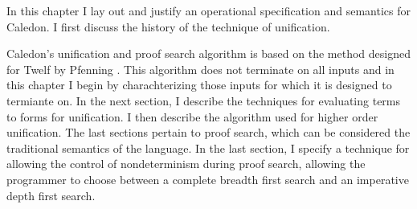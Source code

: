 In this chapter I lay out and justify an operational specification and semantics 
for Caledon.  I first discuss the history of the technique of unification.

Caledon's unification and proof search algorithm is based on the method designed for Twelf by Pfenning
\citep{pfenning1991logic}.  This algorithm does not terminate on all inputs and in this chapter 
I begin by charachterizing those inputs for which it is designed to termiante on.  In the next section, I describe
the techniques for evaluating terms to forms for unification.  I then describe the algorithm
used for higher order unification.  
The last sections pertain to proof search, which can be considered the traditional semantics of the language.
In the last section, I specify a technique for allowing the control of nondeterminism during proof search, 
allowing the programmer to choose between a complete breadth first search and an imperative depth first search.


